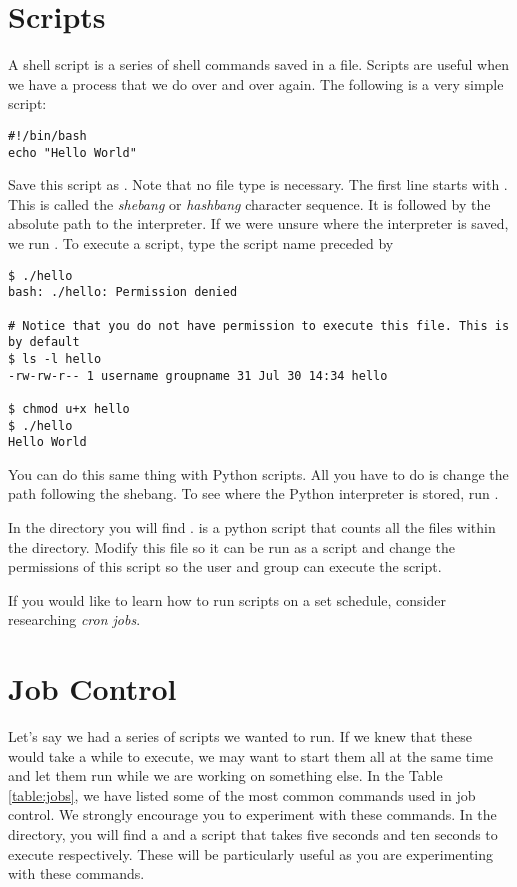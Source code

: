 \section*{Scripts}

A shell script is a series of shell commands saved in a file. Scripts are useful when we have a process that we do over and over again. The following is a very simple script:

\begin{lstlisting}
#!/bin/bash
echo "Hello World"
\end{lstlisting}

Save this script as . Note that no file type is necessary. The first line starts with . This is called the \emph{shebang} or \emph{hashbang} character sequence. It is followed by the absolute path to the  interpreter. If we  were unsure where the  interpreter is saved, we run .  To execute a script, type the script name preceded by 

\begin{lstlisting}
$ ./hello
bash: ./hello: Permission denied

# Notice that you do not have permission to execute this file. This is by default
$ ls -l hello
-rw-rw-r-- 1 username groupname 31 Jul 30 14:34 hello

$ chmod u+x hello
$ ./hello   
Hello World
\end{lstlisting}

You can do this same thing with Python scripts. All you have to do is change the path following the shebang. To see where the Python interpreter is stored, run .

\begin{problem}
In the  directory you will find .  is a python script that counts all the files within the  directory. Modify this file so it can be run as a script and change the permissions of this script so the user and group can execute the script.
\end{problem}

If you would like to learn how to run scripts on a set schedule, consider researching \emph{cron jobs}.

\section*{Job Control}
Let's say we had a series of scripts we wanted to run. If we knew that these would take a while to execute, we may want to start them all at the same time and let them run while we are working on something else. In the Table \ref{table:jobs}, we have listed some of the most common commands used in job control. We strongly encourage you to experiment with these commands. In the  directory, you will find a  and a  script that takes five seconds and ten seconds to execute respectively. These will be particularly useful as you are experimenting with these commands. 

